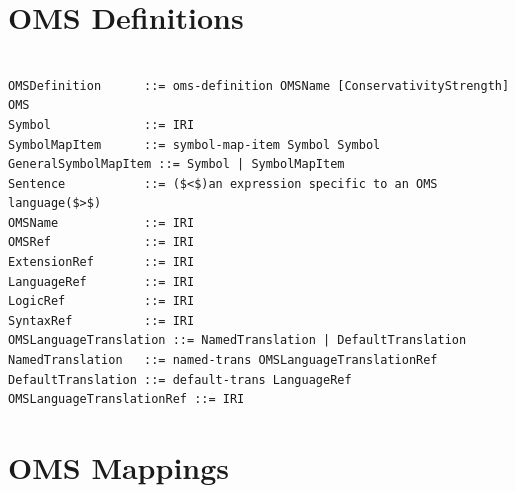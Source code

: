 \documentclass[10pt,fleqn,final]{scrreprt}
\newcommand*{\syntax}[1]{\texttt{#1}}
\newcommand{\sclause}[1]{\section{#1}}
\newenvironment{definitions}[0]{\medskip }{}
\begin{document}
\begin{definitions}


\sclause{OMS Definitions}

\begin{lstlisting}[language=ebnf,escapeinside={()}]  % abstract syntax

OMSDefinition      ::= oms-definition OMSName [ConservativityStrength] OMS
Symbol             ::= IRI
SymbolMapItem      ::= symbol-map-item Symbol Symbol
GeneralSymbolMapItem ::= Symbol | SymbolMapItem
Sentence           ::= ($<$)an expression specific to an OMS language($>$) 
OMSName            ::= IRI
OMSRef             ::= IRI
ExtensionRef       ::= IRI
LanguageRef        ::= IRI
LogicRef           ::= IRI
SyntaxRef          ::= IRI
OMSLanguageTranslation ::= NamedTranslation | DefaultTranslation
NamedTranslation   ::= named-trans OMSLanguageTranslationRef
DefaultTranslation ::= default-trans LanguageRef
OMSLanguageTranslationRef ::= IRI
\end{lstlisting}




\sclause{OMS Mappings}


\begin{lstlisting}[language=ebnf,escapeinside={<>},mathescape]  % abstract syntax


\end{lstlisting}
\end{definitions}
\end{document}
